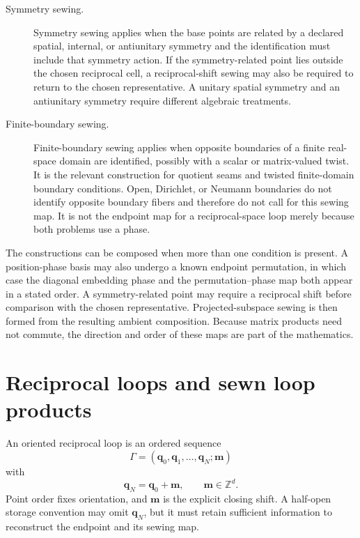 \begin{description}
  \item[Symmetry sewing.]
  Symmetry sewing applies when the base points are related by a declared spatial,
  internal, or antiunitary symmetry and the identification must include that
  symmetry action. If the symmetry-related point lies outside the chosen
  reciprocal cell, a reciprocal-shift sewing may also be required to return to
  the chosen representative. A unitary spatial symmetry and an antiunitary
  symmetry require different algebraic treatments.

  \item[Finite-boundary sewing.]
  Finite-boundary sewing applies when opposite boundaries of a finite real-space
  domain are identified, possibly with a scalar or matrix-valued twist. It is
  the relevant construction for quotient seams and twisted finite-domain
  boundary conditions. Open, Dirichlet, or Neumann boundaries do not identify
  opposite boundary fibers and therefore do not call for this sewing map. It is
  not the endpoint map for a reciprocal-space loop merely because both problems
  use a phase.
\end{description}

The constructions can be composed when more than one condition is present. A
position-phase basis may also undergo a known endpoint permutation, in which
case the diagonal embedding phase and the permutation--phase map both appear in
a stated order. A symmetry-related point may require a reciprocal shift before
comparison with the chosen representative. Projected-subspace sewing is then
formed from the resulting ambient composition. Because matrix products need not
commute, the direction and order of these maps are part of the mathematics.

\section{Reciprocal loops and sewn loop products}

\begin{definition}
\label{def:training-oriented-reciprocal-loop}
An oriented reciprocal loop is an ordered sequence
\begin{equation}
  \Gamma=(\mathbf q_0,\mathbf q_1,\ldots,\mathbf q_N;\mathbf m)
\end{equation}
with
\begin{equation}
  \mathbf q_N=\mathbf q_0+\mathbf m,
  \qquad \mathbf m\in\mathbb Z^d.
\end{equation}
Point order fixes orientation, and \(\mathbf m\) is the explicit closing shift.
A half-open storage convention may omit \(\mathbf q_N\), but it must retain
sufficient information to reconstruct the endpoint and its sewing map.
\end{definition}

